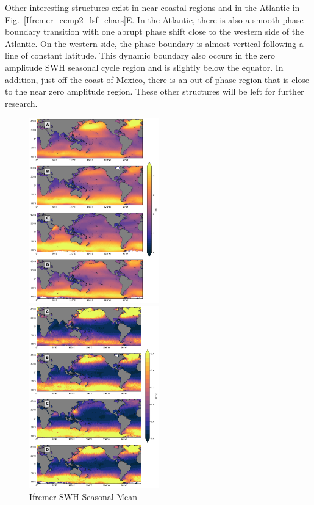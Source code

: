 \documentclass[draft,linenumbers]{agujournal2018}
\begin{document}
Other interesting structures exist in near coastal regions and in the Atlantic in Fig.~\ref{Ifremer_ccmp2_lsf_chars}E. In the Atlantic, there is also a smooth phase boundary transition with one abrupt phase shift close to the western side of the Atlantic. On the western side, the phase boundary is almost vertical following a line of constant latitude. This dynamic boundary also occurs in the zero amplitude SWH seasonal cycle region and is slightly below the equator. In addition, just off the coast of Mexico, there is an out of phase region that is close to the near zero amplitude region. These other structures will be left for further research.

\begin{figure}[tbh]
\centering
  \begin{minipage}{.5\textwidth}
    \centering
    \includegraphics[width=0.5\textwidth]{figs/statistical_moments/Ifremer_p1_seasonal_mean.png}
    \caption{Ifremer SWH Seasonal Mean}
    \label{Ifremer_swh_seasonal_mean}
  \end{minipage}%
  \begin{minipage}{.5\textwidth}
    \centering
    \includegraphics[width=0.5\textwidth]{figs/statistical_moments/Ifremer_p1_seasonal_var.png}

\end{minipage}
\end{figure}
\end{document}
